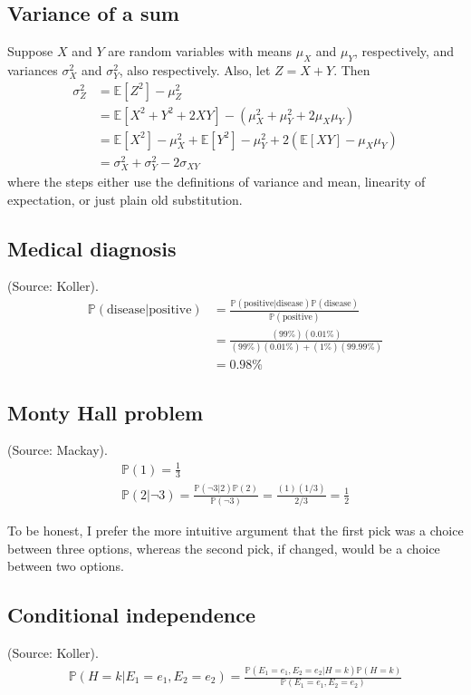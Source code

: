 \documentclass{article}
\begin{document}
\subsection{Variance of a sum}
Suppose $X$ and $Y$ are random variables with means $\mu_X$ and $\mu_Y$, respectively, and variances $\sigma_X^2$ and $\sigma_Y^2$, also respectively. Also, let $Z = X + Y$. Then
\begin{align*}
\sigma_Z^2 &= \mathbb{E}[Z^2] - \mu_Z^2\\
&= \mathbb{E}[X^2 + Y^2 + 2XY] - (\mu_X^2 + \mu_Y^2 + 2\mu_X\mu_Y)\\
&= \mathbb{E}[X^2] - \mu_X^2 + \mathbb{E}[Y^2] - \mu_Y^2 + 2(\mathbb{E}[XY] - \mu_X\mu_Y)\\
&= \sigma_X^2 + \sigma_Y^2 - 2\sigma_{XY}
\end{align*}
where the steps either use the definitions of variance and mean, linearity of expectation, or just plain old substitution.

\subsection{Medical diagnosis}
(Source: Koller).
\begin{align*}
\mathbb{P}(\mathrm{disease}|\mathrm{positive}) &= \frac{\mathbb{P}(\mathrm{positive}|\mathrm{disease}) \mathbb{P}(\mathrm{disease})}{\mathbb{P}(\mathrm{positive})}\\
&= \frac{(99\%)(0.01\%)}{(99\%)(0.01\%)+(1\%)(99.99\%)}\\ &= 0.98\%
\end{align*}

\subsection{Monty Hall problem}
(Source: Mackay).
\begin{gather*}
\mathbb{P}(1) = \frac{1}{3}\\
\mathbb{P}(2|\neg 3) = \frac{\mathbb{P}(\neg 3|2)\mathbb{P}(2)}{\mathbb{P}(\neg 3)} = \frac{(1)(1/3)}{2/3} = \frac{1}{2}
\end{gather*}

To be honest, I prefer the more intuitive argument that the first pick was a choice between three options, whereas the second pick, if changed, would be a choice between two options.

\subsection{Conditional independence}
(Source: Koller).
\begin{gather*}
\mathbb{P}(H=k|E_1=e_1,E_2=e_2) = \frac{\mathbb{P}(E_1=e_1,E_2=e_2|H=k)\mathbb{P}(H=k)}{\mathbb{P}(E_1=e_1,E_2=e_2)}
\end{gather*}
\end{document}
